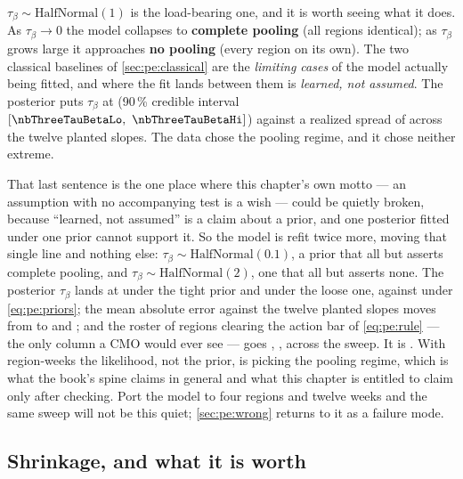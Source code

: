 $\tau_\beta \sim \text{HalfNormal}(1)$ is the load-bearing one, and it is worth seeing what it
does. As $\tau_\beta \to 0$ the model collapses to \textbf{complete pooling} (all regions
identical); as $\tau_\beta$ grows large it approaches \textbf{no pooling} (every region on its
own). The two classical baselines of \cref{sec:pe:classical} are the \emph{limiting cases} of the
model actually being fitted, and where the fit lands between them is \emph{learned, not assumed}.
The posterior puts $\tau_\beta$ at \nbThreeTauBeta{} (90\,\% credible interval
$[\nbThreeTauBetaLo,\ \nbThreeTauBetaHi]$) against a realized spread of \nbThreeTrueTau{} across the
twelve planted slopes. The data chose the pooling regime, and it chose neither extreme.

That last sentence is the one place where this chapter's own motto --- an assumption with no
accompanying test is a wish --- could be quietly broken, because ``learned, not assumed'' is a claim
about a prior, and one posterior fitted under one prior cannot support it. So the model is refit
twice more, moving that single line and nothing else: $\tau_\beta \sim \text{HalfNormal}(0.1)$, a
prior that all but asserts complete pooling, and $\tau_\beta \sim \text{HalfNormal}(2)$, one that all
but asserts none. The posterior $\tau_\beta$ lands at \nbThreeTauTight{} under the tight prior and
\nbThreeTauLoose{} under the loose one, against \nbThreeTauBeta{} under
\cref{eq:pe:priors}; the mean absolute error against the twelve planted slopes moves from
\nbThreeMaePartialOne{} to \nbThreeMaeTight{} and \nbThreeMaeLoose; and the roster of regions
clearing the action bar of \cref{eq:pe:rule} --- the only column a CMO would ever see --- goes
\nbThreeActPpTight, \nbThreeActPp, \nbThreeActPpLoose{} across the sweep. It is
\nbThreeTauVerdict. With \nbThreeNObs{} region-weeks the likelihood, not the prior, is picking the
pooling regime, which is what the book's spine claims in general and what this chapter is entitled to
claim only after checking. Port the model to four regions and twelve weeks and the same sweep will
not be this quiet; \cref{sec:pe:wrong} returns to it as a failure mode.

\subsection*{Shrinkage, and what it is worth}

